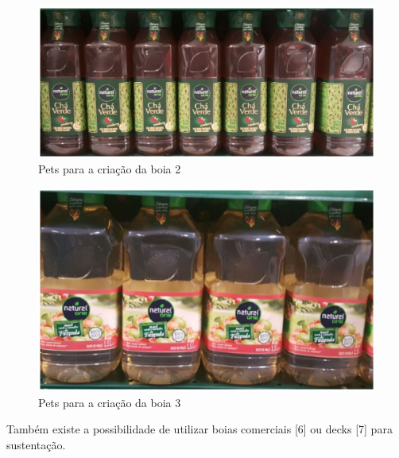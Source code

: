 \begin{figure}[H]
 \centering
   \includegraphics[keepaspectratio=true,scale=0.8]{figuras/garrafa_1.eps}
 \caption{Pets para a criação da boia 2}
 \label{pets1}
\end{figure}

\begin{figure}[H]
 \centering
   \includegraphics[keepaspectratio=true,scale=0.8]{figuras/garrafa_2.eps}
 \caption{Pets para a criação da boia 3}
 \label{pets2}
\end{figure}

Também existe a possibilidade de utilizar boias comerciais [6]  ou decks [7] para sustentação.

